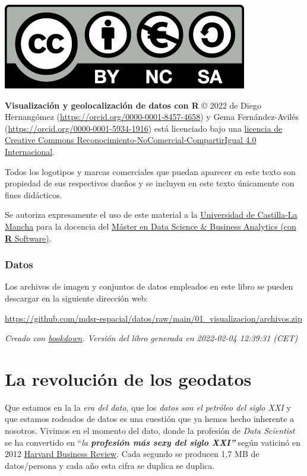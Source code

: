\documentclass[
]{book}
\theoremstyle{definition}
\theoremstyle{definition}
\theoremstyle{definition}
\theoremstyle{definition}
\theoremstyle{remark}
\begin{document}
\begin{center}\includegraphics[width=0.25\linewidth]{img/by-nc-sa.eu} \end{center}

\textbf{Visualización y geolocalización de datos con R} © 2022 de Diego Hernangómez (\url{https://orcid.org/0000-0001-8457-4658}) y Gema
Fernández-Avilés (\url{https://orcid.org/0000-0001-5934-1916})
está licenciado bajo una \href{http://creativecommons.org/licenses/by-nc-sa/4.0/}{licencia de Creative Commons
Reconocimiento-NoComercial-CompartirIgual 4.0
Internacional}.

Todos los logotipos y marcas comerciales que puedan aparecer en este texto son
propiedad de sus respectivos dueños y se incluyen en este texto únicamente con
fines didácticos.

Se autoriza expresamente el uso de este material a la \href{https://www.uclm.es/}{Universidad de
Castilla-La Mancha} para la docencia del \href{https://blog.uclm.es/tp-mbsba/}{Máster en Data
Science \& Business Analytics (con \textbf{R}
Software)}.

\hypertarget{datos}{%
\subsection*{Datos}\label{datos}}

Los archivos de imagen y conjuntos de datos empleados en este libro se pueden
descargar en la siguiente dirección web:

\url{https://github.com/mdsr-espacial/datos/raw/main/01_visualizacion/archivos.zip}

\emph{Creado con \href{https://bookdown.org/}{bookdown}. Versión del libro generada en
2022-02-04 12:39:31 (CET)}

\hypertarget{la-revoluciuxf3n-de-los-geodatos}{%
\chapter{La revolución de los geodatos}\label{la-revoluciuxf3n-de-los-geodatos}}

Que estamos en la la \emph{era del dato}, que los \emph{datos son el petróleo del siglo
XXI} y que estamos rodeados de datos es una cuestión que ya hemos hecho
inherente a nosotros. Vivimos en el momento del dato, donde la profesión de
\emph{Data Scientist} se ha convertido en ``\emph{la \textbf{profesión más sexy del siglo XXI''}}
según vaticinó en 2012 \href{https://hbr.org/2012/10/data-scientist-the-sexiest-job-of-the-21st-century}{Harvard Business
Review}.
Cada segundo se producen 1,7 MB de datos/persona y cada año esta cifra se
duplica se duplica.
\end{document}
